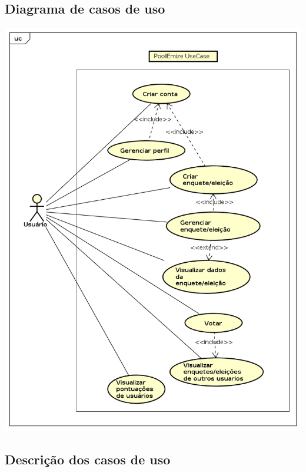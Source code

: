 \documentclass[a4paper,12pt]{report}
\begin{document}
\subsection*{Diagrama de casos de uso}
\markright{}
\includegraphics[width=14.3cm]{use_cases/UseCaseDiagram.png}
\newpage
\subsection*{Descrição dos casos de uso}
\markright{}
\end{document}
